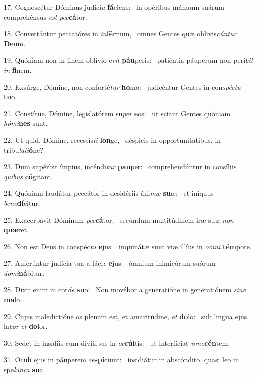17. Cognoscétur Dóminus judíci\textit{a} \textbf{fá}ciens: \ast\  in opéribus mánuum suárum comprehénsus \textit{est} \textit{pec}\textbf{cá}tor.\

18. Convertántur peccatóres in \textit{in}\textbf{fér}num, \ast\  omnes Gentes quæ oblivis\textit{cún}\textit{tur} \textbf{De}um.\

19. Quóniam non in finem oblívio e\textit{rit} \textbf{páu}peris: \ast\  patiéntia páuperum non perí\textit{bit} \textit{in} \textbf{fi}nem.\

20. Exsúrge, Dómine, non conforté\textit{tur} \textbf{ho}mo: \ast\  judicéntur Gentes in con\textit{spéc}\textit{tu} \textbf{tu}o.\

21. Constítue, Dómine, legislatórem su\textit{per} \textbf{e}os: \ast\  ut sciant Gentes quóniam \textit{hó}\textit{mi}\textbf{nes} sunt.\

22. Ut quid, Dómine, recessís\textit{ti} \textbf{lon}ge, \ast\  déspicis in opportunitátibus, in tribu\textit{la}\textit{ti}\textbf{ó}ne?\

23. Dum supérbit ímpius, incéndi\textit{tur} \textbf{pau}per: \ast\  comprehendúntur in consíliis \textit{qui}\textit{bus} \textbf{có}gitant.\

24. Quóniam laudátur peccátor in desidériis áni\textit{mæ} \textbf{su}æ: \ast\  et iníquus \textit{be}\textit{ne}\textbf{dí}citur.\

25. Exacerbávit Dóminum \textit{pec}\textbf{cá}tor, \ast\  secúndum multitúdinem iræ su\textit{æ} \textit{non} \textbf{quæ}ret.\

26. Non est Deus in conspéc\textit{tu} \textbf{e}jus: \ast\  inquinátæ sunt viæ illíus in \textit{om}\textit{ni} \textbf{tém}pore.\

27. Auferúntur judícia tua a fáci\textit{e} \textbf{e}jus: \ast\  ómnium inimicórum suórum \textit{do}\textit{mi}\textbf{ná}bitur.\

28. Dixit enim in cor\textit{de} \textbf{su}o: \ast\  Non movébor a generatióne in generatiónem \textit{si}\textit{ne} \textbf{ma}lo.\

29. Cujus maledictióne os plenum est, et amaritúdine, \textit{et} \textbf{do}lo: \ast\  sub lingua ejus la\textit{bor} \textit{et} \textbf{do}lor.\

30. Sedet in insídiis cum divítibus in \textit{oc}\textbf{cúl}tis: \ast\  ut interfíciat \textit{in}\textit{no}\textbf{cén}tem.\

31. Oculi ejus in páuperem \textit{re}\textbf{spí}ciunt: \ast\  insidiátur in abscóndito, quasi leo in spe\textit{lún}\textit{ca} \textbf{su}a.\

